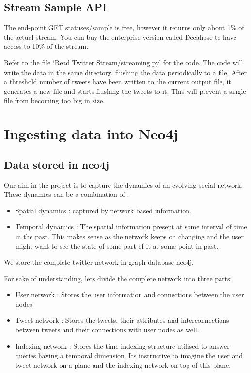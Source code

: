 \documentclass[letterpaper,10pt,english]{sphinxmanual}
\begin{document}
\section{Stream Sample API}
\label{\detokenize{twitter_stream:stream-sample-api}}
The end-point GET statuses/sample is free, however it returns only about 1\% of the actual stream. You can buy the enterprise version called Decahose to have access to 10\% of the stream.

Refer to the file ‘Read Twitter Stream/streaming.py’ for the code. The code will write the data in the same directory, flushing the data periodically to a file. After a threshold number of tweets have been written to the current output file, it generates a new file and starts flushing the tweets to it. This will prevent a single file from becoming too big in size.


\chapter{Ingesting data into Neo4j}
\label{\detokenize{neo4j_data_ingestion:ingesting-data-into-neo4j}}\label{\detokenize{neo4j_data_ingestion::doc}}

\section{Data stored in neo4j}
\label{\detokenize{neo4j_data_ingestion:data-stored-in-neo4j}}
Our aim in the project is to capture the dynamics of an evolving social network. These dynamics can be a combination of :
\begin{itemize}
\item {} 
Spatial dynamics : captured by network based information.

\item {} 
Temporal dynamics : The spatial information present at some interval of time in the past. This makes sense as the network keeps on changing and the user might want to see the state of some part of it at some point in past.

\end{itemize}

We store the complete twitter network in graph database neo4j.

For sake of understanding, lets divide the complete network into three parts:
\begin{itemize}
\item {} 
User network : Stores the user information and connections between the user nodes

\item {} 
Tweet network : Stores the tweets, their attributes and interconnections between tweets and their connections with user nodes as well.

\item {} 
Indexing network : Stores the time indexing structure utilised to answer queries having a temporal dimension. Its instructive to imagine the user and tweet network on a plane and the indexing network on top of this plane.

\end{itemize}
\end{document}
